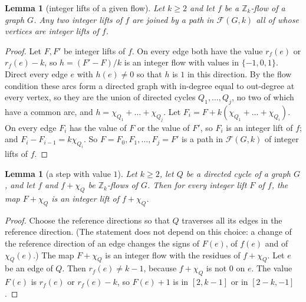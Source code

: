 \documentclass[11pt]{article}
\newtheorem{lemma}[theorem]{Lemma}
\theoremstyle{definition}
\newcommand{\Z}{\mathbb{Z}}
\newcommand{\cF}{\mathcal{F}}
\begin{document}
\begin{lemma}[integer lifts of a given flow]\label{lem:fibre}
Let $k\ge 2$ and let $f$ be a $\Z_k$-flow of a graph $G$. Any two integer lifts of $f$ are joined by a path in
$\cF(G,k)$ all of whose vertices are integer lifts of $f$.
\end{lemma}
\begin{proof}
Let $F,F'$ be integer lifts of $f$. On every edge both have the value $r_f(e)$ or $r_f(e)-k$, so $h=(F'-F)/k$ is an
integer flow with values in $\{-1,0,1\}$. Direct every edge $e$ with $h(e)\ne 0$ so that $h$ is $1$ in this
direction. By the flow condition these arcs form a directed graph with in-degree equal to out-degree at every vertex,
so they are the union of directed cycles $Q_1,\dots,Q_j$, no two of which have a common arc, and
$h=\chi_{Q_1}+\dots+\chi_{Q_j}$. Let $F_i=F+k(\chi_{Q_1}+\dots+\chi_{Q_i})$. On every edge $F_i$ has the value of $F$
or the value of $F'$, so $F_i$ is an integer lift of $f$; and $F_i-F_{i-1}=k\chi_{Q_i}$. So $F=F_0,F_1,\dots,F_j=F'$
is a path in $\cF(G,k)$ of integer lifts of $f$.
\end{proof}

\begin{lemma}[a step with value $1$]\label{lem:step1}
Let $k\ge 2$, let $Q$ be a directed cycle of a graph $G$, and let $f$ and $f+\chi_Q$ be $\Z_k$-flows of $G$. Then for
every integer lift $F$ of $f$, the map $F+\chi_Q$ is an integer lift of $f+\chi_Q$.
\end{lemma}
\begin{proof}
Choose the reference directions so that $Q$ traverses all its edges in the reference direction. (The statement does
not depend on this choice: a change of the reference direction of an edge changes the signs of $F(e)$, of $f(e)$ and
of $\chi_Q(e)$.) The map $F+\chi_Q$ is an integer flow with the residues of $f+\chi_Q$. Let $e$ be an edge of $Q$. Then
$r_f(e)\ne k-1$, because $f+\chi_Q$ is not $0$ on $e$. The value $F(e)$ is $r_f(e)$ or $r_f(e)-k$, so $F(e)+1$ is in
$[2,k-1]$ or in $[2-k,-1]$.
\end{proof}
\end{document}
